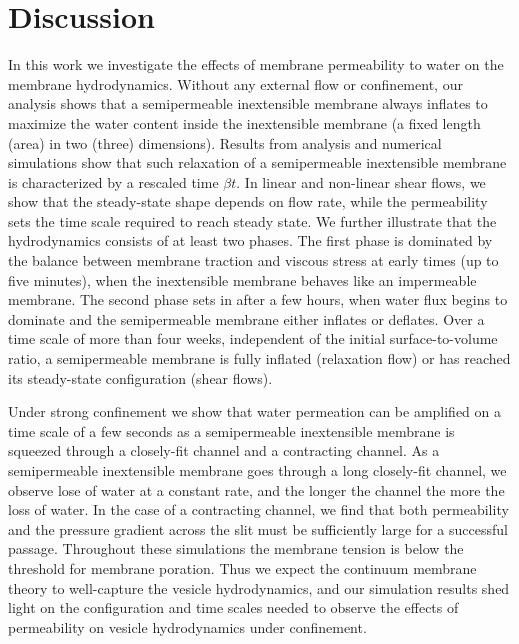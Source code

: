 \documentclass[prb,preprint,showpacs,preprintnumbers,amsmath,amssymb,longbibliography]{revtex4-1}
\begin{document}
\section{Discussion}
In this work we investigate the effects of membrane permeability to
water on the membrane hydrodynamics. Without any external flow or
confinement, our analysis shows that a semipermeable inextensible
membrane always inflates to maximize the water content inside the
inextensible membrane (a fixed length (area) in two (three) dimensions).
Results from analysis and numerical simulations show that such
relaxation of a semipermeable inextensible membrane is characterized by
a rescaled time $\beta t$. In linear and non-linear shear flows, we show
that the steady-state shape depends on flow rate, while the permeability
sets the time scale required to reach steady state. We further
illustrate that the hydrodynamics consists of at least two phases. The
first phase is dominated by the balance between membrane traction and
viscous stress at early times (up to five minutes), when the
inextensible membrane behaves like an impermeable membrane. The second
phase sets in after a few hours, when water flux begins to dominate and
the semipermeable membrane either inflates or deflates. Over a time
scale of more than four weeks, independent of the initial
surface-to-volume ratio, a semipermeable membrane is fully inflated
(relaxation flow) or has reached its steady-state configuration (shear
flows).

Under strong confinement we show that water permeation can be amplified
on a time scale of a few seconds as a semipermeable inextensible
membrane is squeezed through a closely-fit channel and a contracting
channel. As a semipermeable inextensible membrane goes through a long
closely-fit channel, we observe lose of water at a constant rate, and
the longer the channel the more the loss of water. In the case of a
contracting channel, we find that both permeability and the pressure
gradient across the slit must be sufficiently large for a successful
passage. Throughout these simulations the membrane tension is below the
threshold for membrane poration. Thus we expect the continuum membrane
theory to well-capture the vesicle hydrodynamics, and our simulation
results shed light on the configuration and time scales needed to
observe the effects of permeability on vesicle hydrodynamics under
confinement. 

\end{document}

